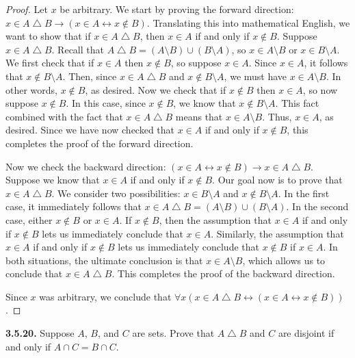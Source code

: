 \documentclass[12pt]{amsart}
\newenvironment{statement}[1]{\smallskip\noindent\color[rgb]{.6627, .3529, .6314} {\bf #1.}}{}
\theoremstyle{definition}
\theoremstyle{remark}
\begin{document}
\begin{proof}
Let $x$ be arbitrary.
We start by proving the forward direction: $x \in A \bigtriangleup B \rightarrow (x \in A \leftrightarrow x \notin B)$.
Translating this into mathematical English, we want to show that if $x \in A \bigtriangleup B$, then $x \in A$ if and only if $x \notin B$.
Suppose $x \in A \bigtriangleup B$.
Recall that $A \bigtriangleup B = (A \setminus B) \cup (B \setminus A)$, so $x \in A \setminus B$ or $x \in B \setminus A$.
We first check that if $x \in A$ then $x \notin B$, so suppose $x \in A$.
Since $x \in A$, it follows that $x \notin B \setminus A$.
Then, since $x \in A \bigtriangleup B$ and $x \notin B \setminus A$, we must have $x \in A \setminus B$.
In other words, $x \notin B$, as desired.
Now we check that if $x \notin B$ then $x \in A$, so now suppose $x \notin B$.
In this case, since $x \notin B$, we know that $x \notin B \setminus A$.
This fact combined with the fact that $x \in A \bigtriangleup B$ means that $x \in A \setminus B$.
Thus, $x \in A$, as desired.
Since we have now checked that $x \in A$ if and only if $x \notin B$, this completes the proof of the forward direction.

Now we check the backward direction: $(x \in A \leftrightarrow x \notin B) \rightarrow x \in A \bigtriangleup B$.
Suppose we know that $x \in A$ if and only if $x \notin B$.
Our goal now is to prove that $x \in A \bigtriangleup B$.
We consider two possibilities: $x \in B \setminus A$ and $x \notin B \setminus A$.
In the first case, it immediately follows that $x \in A \bigtriangleup B = (A \setminus B) \cup (B \setminus A)$.
In the second case, either $x \notin B$ or $x \in A$.
If $x \notin B$, then the assumption that $x \in A$ if and only if $x \notin B$ lets us immediately conclude that $x \in A$.
Similarly, the assumption that $x \in A$ if and only if $x \notin B$ lets us immediately conclude that $x \notin B$ if $x \in A$.
In both situations, the ultimate conclusion is that $x \in A \setminus B$, which allows us to conclude that $x \in A \bigtriangleup B$.
This completes the proof of the backward direction.

Since $x$ was arbitrary, we conclude that $\forall x (x \in A \bigtriangleup B \leftrightarrow (x \in A \leftrightarrow x \notin B))$.
\end{proof}


\begin{statement}{3.5.20}
Suppose $A$, $B$, and $C$ are sets.
Prove that $A \bigtriangleup B$ and $C$ are disjoint if and only if $A \cap C = B \cap C$.
\end{statement}
\end{document}
